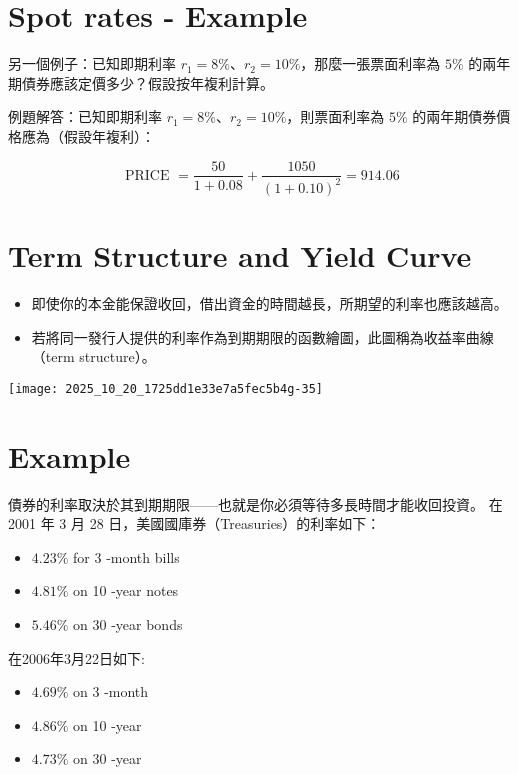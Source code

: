 \documentclass[letterpaper]{article}
\begin{document}
\section*{Spot rates - Example}
另一個例子：已知即期利率 \(r_{1} = 8\%\)、\(r_{2} = 10\%\)，那麼一張票面利率為 \(5\%\) 的兩年期債券應該定價多少？假設按年複利計算。

例題解答：已知即期利率 \(r_{1} = 8\%\)、\(r_{2} = 10\%\)，則票面利率為 \(5\%\) 的兩年期債券價格應為（假設年複利）：


$$
\text { PRICE }=\frac{50}{1+0.08}+\frac{1050}{(1+0.10)^{2}}=914.06
$$

\section*{Term Structure and Yield Curve}
\begin{itemize}
	\item 即使你的本金能保證收回，借出資金的時間越長，所期望的利率也應該越高。
	\item 若將同一發行人提供的利率作為到期期限的函數繪圖，此圖稱為收益率曲線（term structure）。
\end{itemize}

\texttt{[image: 2025\_10\_20\_1725dd1e33e7a5fec5b4g-35]}

\section*{Example}
債券的利率取決於其到期期限——也就是你必須等待多長時間才能收回投資。  在 2001 年 3 月 28 日，美國國庫券（Treasuries）的利率如下：


\begin{itemize}
  \item $4.23 \%$ for 3 -month bills
  \item $4.81 \%$ on 10 -year notes
  \item $5.46 \%$ on 30 -year bonds
\end{itemize}

在2006年3月22日如下:

\begin{itemize}
  \item $4.69 \%$ on 3 -month
  \item $4.86 \%$ on 10 -year
  \item $4.73 \%$ on 30 -year
\end{itemize}
\end{document}
